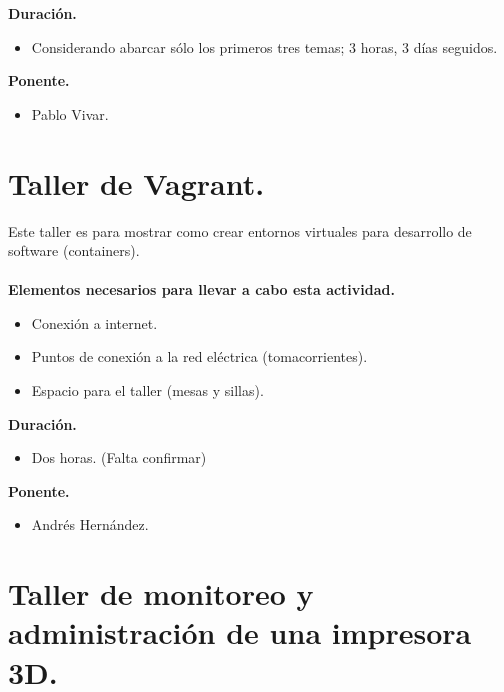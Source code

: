 \documentclass[a4paper,11pt]{article}                 %
\begin{document}
  \textbf{Duración.}
  \begin{itemize}
    \item Considerando abarcar sólo los primeros tres temas; 3 horas, 3 días seguidos.
  \end{itemize}
  
            \textbf{Ponente.}
  \begin{itemize}
    \item Pablo Vivar.
  \end{itemize}
  
  
        \section{Taller de Vagrant.}                                     %

  Este taller es para mostrar como crear entornos virtuales para desarrollo de software (containers).
      \paragraph{}
  \textbf{Elementos necesarios para llevar a cabo esta actividad.}
  \begin{itemize}
    \item Conexión a internet.
    \item Puntos de conexión a la red eléctrica (tomacorrientes).
    \item Espacio para el taller (mesas y sillas).
  \end{itemize}
  
  \textbf{Duración.}
  \begin{itemize}
    \item Dos horas. (Falta confirmar)
  \end{itemize}
  
              \textbf{Ponente.}
  \begin{itemize}
    \item Andrés Hernández.
  \end{itemize}
  
  

  
  
            \section{Taller de monitoreo y administración de una impresora 3D.}                                     %
\end{document}
